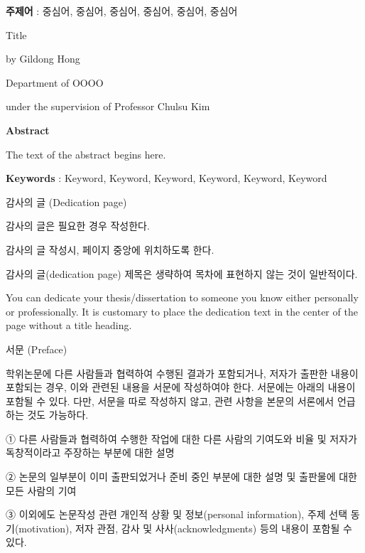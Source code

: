 \documentclass[11pt]{report}
\numberwithin{figure}{chapter}
\theoremstyle{plain}
\theoremstyle{definition}
\theoremstyle{corollary}
\theoremstyle{definition}
\theoremstyle{plain}
\theoremstyle{definition}
\theoremstyle{plain}
\begin{document}
\textbf{주제어} : 중심어, 중심어, 중심어, 중심어, 중심어, 중심어


\newpage
\begin{center}
\Large Title

\par\vspace{20pt}

\normalsize by Gildong Hong\par
Department of OOOO\par
under the supervision of Professor Chulsu Kim

\par\vspace{20pt}

\Large \textbf{Abstract}
\end{center}
\normalsize
The text of the abstract begins here. 

\par\vspace{100pt}

\textbf{Keywords} : Keyword, Keyword, Keyword, Keyword, Keyword, Keyword

\newpage
\begin{center}
\large
감사의 글 (Dedication page)
\end{center}
\normalsize
감사의 글은 필요한 경우 작성한다.

감사의 글 작성시, 페이지 중앙에 위치하도록 한다. 

감사의 글(dedication page) 제목은 생략하여 목차에 표현하지 않는 것이 일반적이다.

You can dedicate your thesis/dissertation to someone you know either personally or professionally.
It is customary to place the dedication text in the center of the page without a title heading.

\newpage
\begin{center}
\large
서문 (Preface)
\end{center}
\normalsize
학위논문에 다른 사람들과 협력하여 수행된 결과가 포함되거나, 저자가 출판한 내용이 포함되는 경우, 이와 관련된 내용을 서문에 작성하여야 한다.
서문에는 아래의 내용이 포함될 수 있다.
다만, 서문을 따로 작성하지 않고, 관련 사항을 본문의 서론에서 언급하는 것도 가능하다. 

① 다른 사람들과 협력하여 수행한 작업에 대한 다른 사람의 기여도와 비율 및 저자가 독창적이라고 주장하는 부분에 대한 설명

② 논문의 일부분이 이미 출판되었거나 준비 중인 부분에 대한 설명 및 출판물에 대한 모든 사람의 기여

③ 이외에도 논문작성 관련 개인적 상황 및 정보(personal information), 주제 선택 동기(motivation), 저자 관점, 감사 및 사사(acknowledgments) 등의 내용이 포함될 수 있다.
\end{document}
